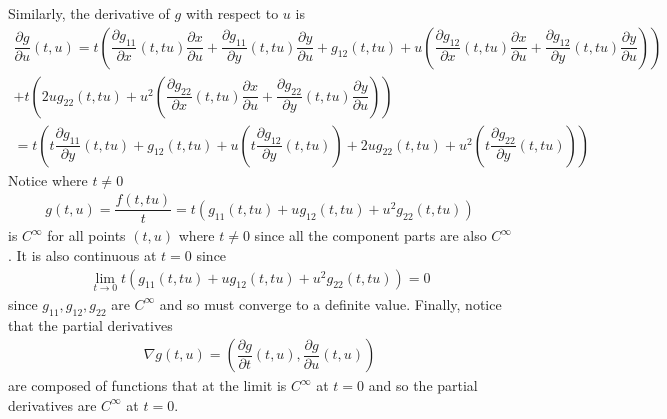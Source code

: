 \documentclass{article}
\begin{document}
	Similarly, the derivative of $g$ with respect to $u$ is
	\begin{gather*}
		\dfrac{\partial g}{\partial u}(t, u) = t \left(
		\dfrac{\partial g_{11}}{\partial x} (t, tu) \dfrac{\partial x}{\partial u} + \dfrac{\partial g_{11}}{\partial y} (t, tu) \dfrac{\partial y}{\partial u}
		+ g_{12}(t, tu) + u \left( \dfrac{\partial g_{12}}{\partial x} (t, tu) \dfrac{\partial x}{\partial u} + \dfrac{\partial g_{12}}{\partial y} (t, tu) \dfrac{\partial y}{\partial u} \right) \right) \\
		+ t \left( 2u g_{22}(t, tu) + u^2 \left( \dfrac{\partial g_{22}}{\partial x} (t, tu) \dfrac{\partial x}{\partial u} + \dfrac{\partial g_{22}}{\partial y} (t, tu) \dfrac{\partial y}{\partial u} \right) \right) \\
		= t \left(
		t \dfrac{\partial g_{11}}{\partial y} (t, tu)
		+ g_{12}(t, tu) + u \left( t \dfrac{\partial g_{12}}{\partial y} (t, tu) \right) + 2u g_{22}(t, tu) + u^2 \left( t \dfrac{\partial g_{22}}{\partial y} (t, tu) \right) \right)
	\end{gather*}
	Notice where $t \neq 0$
	\begin{gather*}
		g(t, u) = \dfrac{f(t, tu)}{t} = t \left( g_{11}(t, tu) + u g_{12}(t, tu) + u^2 g_{22}(t, tu) \right)
	\end{gather*}
	is $C^{\infty}$ for all points $(t, u)$ where $t \neq 0$ since all the component parts are also $C^{\infty}$. It is also continuous at $t = 0$ since
	\begin{gather*}
		\lim_{t \to 0} t \left( g_{11}(t, tu) + u g_{12}(t, tu) + u^2 g_{22}(t, tu) \right) = 0
	\end{gather*}
	since $g_{11}, g_{12}, g_{22}$ are $C^{\infty}$ and so must converge to a definite value. Finally, notice that the partial derivatives
	\begin{gather*}
		\nabla g(t, u) = \left( \dfrac{\partial g}{\partial t}(t, u), \dfrac{\partial g}{\partial u}(t, u) \right)
	\end{gather*}
	are composed of functions that at the limit is $C^{\infty}$ at $t = 0$ and so the partial derivatives are $C^{\infty}$ at $t = 0$.
	
	
\end{document}
